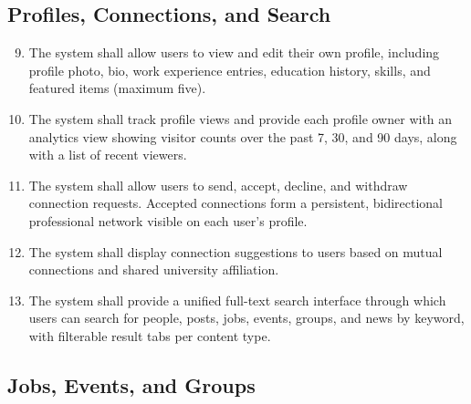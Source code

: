 \documentclass[12pt, a4paper]{article}
\begin{document}
\subsection{Profiles, Connections, and Search}

\begin{enumerate}[label=\textbf{FR-\arabic*:}, leftmargin=*, align=left]
\setcounter{enumi}{8}

    \item The system shall allow users to view and edit their own profile, including
    profile photo, bio, work experience entries, education history, skills, and
    featured items (maximum five).

    \item The system shall track profile views and provide each profile owner with
    an analytics view showing visitor counts over the past 7, 30, and 90 days,
    along with a list of recent viewers.

    \item The system shall allow users to send, accept, decline, and withdraw
    connection requests. Accepted connections form a persistent, bidirectional
    professional network visible on each user's profile.

    \item The system shall display connection suggestions to users based on mutual
    connections and shared university affiliation.

    \item The system shall provide a unified full-text search interface through which
    users can search for people, posts, jobs, events, groups, and news by keyword,
    with filterable result tabs per content type.

\end{enumerate}

\subsection{Jobs, Events, and Groups}
\end{document}

